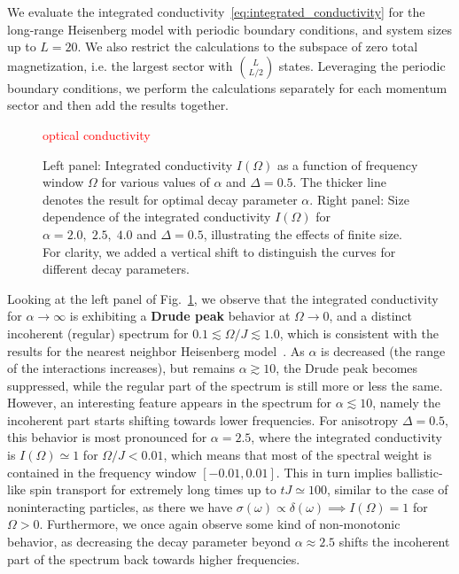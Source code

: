 We evaluate the integrated conductivity~\eqref{eq:integrated_conductivity} for the long-range Heisenberg model
with periodic boundary conditions, and system sizes up to \(L=20\). We also restrict the calculations to the
subspace of zero total magnetization, i.e. the largest sector with \(\binom{L}{L/2}\) states. Leveraging
the periodic boundary conditions, we perform the calculations separately for each momentum sector and then
add the results together.

\begin{figure}[htbp]
  \centering
  \textcolor{red}{optical conductivity}
  \caption{Left panel: Integrated conductivity \(I(\varOmega)\) as a function of frequency window \(\varOmega\) for various values of \(\alpha\)
  and \(\Delta = 0.5\). The thicker line denotes the result for optimal decay parameter \(\alpha\). Right panel: Size dependence
  of the integrated conductivity \(I(\varOmega)\) for \(\alpha = 2.0, \; 2.5,\; 4.0\) and \(\Delta = 0.5\),
  illustrating the effects of finite size. For clarity, we added a vertical shift to distinguish the curves for different
  decay parameters.}
  \label{fig:optical_conductivity}
\end{figure}

Looking at the left panel of Fig.~\ref{fig:optical_conductivity}, we observe that the integrated conductivity
for \(\alpha \to \infty\) is exhibiting a \textbf{Drude peak} behavior at \(\varOmega \to 0\), and a distinct 
incoherent (regular) spectrum for \(0.1 \lesssim \varOmega / J \lesssim 1.0\), which is consistent with the results
for the nearest neighbor Heisenberg model~\autocite{Prelovsek2021}. As \(\alpha\) is decreased 
(the range of the interactions increases), but remains \(\alpha \gtrsim 10\), the Drude peak
becomes suppressed, while the regular part of the spectrum is still more or less the same.
However, an interesting feature appears in the spectrum for \(\alpha \lesssim 10\), namely
the incoherent part starts shifting towards lower frequencies. For anisotropy \(\Delta = 0.5\),
this behavior is most pronounced for \(\alpha = 2.5\), where the integrated conductivity
is \(I(\varOmega)\simeq 1 \) for \( \varOmega/J < 0.01\), which means that most of the spectral weight
is contained in the frequency window \(\left[-0.01,0.01\right]\). This in turn implies ballistic-like 
spin transport for extremely long times up to \(tJ \simeq 100\), similar to the case of noninteracting particles,
as there we have \(\sigma(\omega) \propto \delta(\omega) \implies I(\varOmega) = 1\) for \(\varOmega > 0\). Furthermore,
we once again observe some kind of non-monotonic behavior, as decreasing the decay parameter
beyond \(\alpha \approx 2.5\) shifts the incoherent part of the spectrum back towards higher frequencies.

